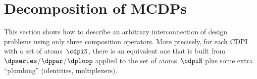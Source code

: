 
\section{Decomposition of MCDPs}
\label{sec:Decomposition}


\label{sec:Decomposing2}
This section shows how to describe an arbitrary interconnection of design problems using only three composition operators.
More precisely, for each CDPI with a set of atoms~$\cdpiN$, there is an equivalent one that is built from $\dpseries$/$\dppar$/$\dploop$ applied to the set of atoms~$\cdpiN$ plus some extra ``plumbing'' (identities, multiplexers).





